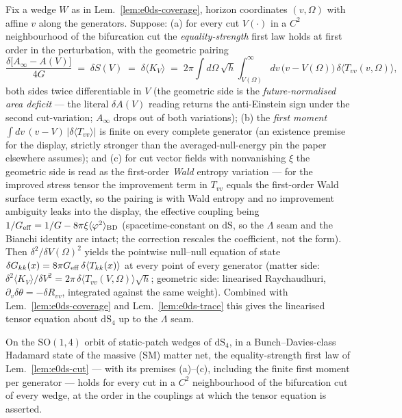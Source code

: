 \begin{lemma}
\label{lem:e0ds-cut}
Fix a wedge $W$ as in Lem.~\ref{lem:e0ds-coverage}, horizon
coordinates $(v,\Omega)$ with affine $v$ along the generators.
Suppose: (a) for every cut $V(\cdot)$ in a $C^{2}$ neighbourhood of
the bifurcation cut the \emph{equality-strength} first law holds at
first order in the perturbation, with the geometric pairing
\[
\frac{\delta\bigl[A_{\infty}-A(V)\bigr]}{4G}\;=\;\delta S(V)
\;=\;\delta\langle
K_{V}\rangle \;=\;2\pi\!\int\!d\Omega\,\sqrt h
\int_{V(\Omega)}^{\infty}\!\!dv\,\bigl(v-V(\Omega)\bigr)\,
\delta\langle T_{vv}(v,\Omega)\rangle,
\]
both sides twice differentiable in $V$ (the geometric side is the
\emph{future-normalised area deficit} --- the literal $\delta A(V)$
reading returns the anti-Einstein sign under the second
cut-variation; $A_{\infty}$ drops out of both variations); (b) the \emph{first moment}
$\int dv\,(v-V)\,|\delta\langle T_{vv}\rangle|$ is finite on every
complete generator (an existence premise for the display, strictly
stronger than the averaged-null-energy pin the paper elsewhere
assumes); and (c) for cut vector fields with nonvanishing
$\xi$ the geometric side is read as the first-order \emph{Wald}
entropy variation --- for the improved stress tensor the improvement
term in $T_{vv}$ equals the first-order Wald surface term exactly,
so the pairing is with Wald entropy and no improvement ambiguity
leaks into the display, the effective coupling being
$1/G_{\rm eff}=1/G-8\pi\xi\langle\varphi^{2}\rangle_{\rm BD}$
(spacetime-constant on $\mathrm{dS}$, so the $\Lambda$ seam and the
Bianchi identity are intact; the correction rescales the coefficient,
not the form). Then $\delta^{2}/\delta V(\Omega)^{2}$
yields the pointwise null--null equation of state
$\delta G_{kk}(x)=8\pi G_{\rm eff}\,\delta\langle T_{kk}(x)\rangle$ at every
point of every generator (matter side:
$\delta^{2}\langle K_{V}\rangle/\delta V^{2}
=2\pi\,\delta\langle T_{vv}(V,\Omega)\rangle\sqrt h$; geometric
side: linearised Raychaudhuri, $\partial_{v}\delta\theta
=-\delta R_{vv}$, integrated against the same weight). Combined with
Lem.~\ref{lem:e0ds-coverage} and Lem.~\ref{lem:e0ds-trace} this
gives the linearised tensor equation about $\mathrm{dS}_4$ up to the
$\Lambda$ seam.
\end{lemma}

\begin{hypothesis}
\label{hyp:E0-dS-min}
On the $\mathrm{SO}(1,4)$ orbit of static-patch wedges of
$\mathrm{dS}_4$, in a Bunch--Davies-class Hadamard state of the
massive (SM) matter net, the equality-strength first law of
Lem.~\ref{lem:e0ds-cut} --- with its premises (a)--(c), including
the finite first moment per generator --- holds for every cut in a
$C^{2}$ neighbourhood of the bifurcation cut of every wedge, at the
order in the couplings at which the tensor equation is asserted.
\end{hypothesis}

